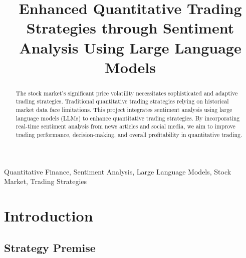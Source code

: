 \documentclass[conference]{IEEEtran}
\begin{document}
\title{Enhanced Quantitative Trading Strategies through Sentiment Analysis Using Large Language Models}

\author{
\and
{}
\and
{}
}

\maketitle

\begin{abstract}
The stock market's significant price volatility necessitates sophisticated and adaptive trading strategies. 
Traditional quantitative trading strategies relying on historical market data face limitations. 
This project integrates sentiment analysis using large language models (LLMs) to enhance quantitative trading strategies. 
By incorporating real-time sentiment analysis from news articles and social media, we aim to improve trading performance, decision-making, and overall profitability in quantitative trading.
\end{abstract}

\begin{IEEEkeywords}
Quantitative Finance, Sentiment Analysis, Large Language Models, Stock Market, Trading Strategies
\end{IEEEkeywords}

\section{\textbf{Introduction}}

\subsection{\textbf{Strategy Premise}}
\end{document}
